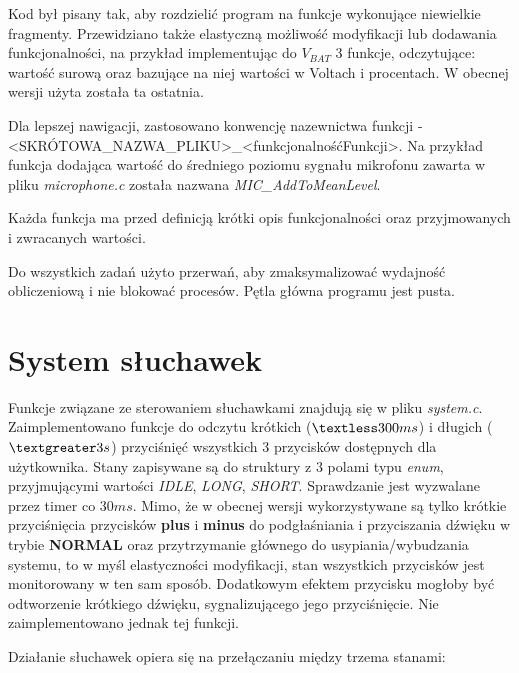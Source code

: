 Kod był pisany tak, aby rozdzielić program na funkcje wykonujące niewielkie fragmenty. Przewidziano także elastyczną możliwość modyfikacji lub dodawania funkcjonalności, na przykład implementując do $V_{BAT}$ 3 funkcje, odczytujące: wartość surową oraz bazujące na niej wartości w Voltach i procentach. W obecnej wersji użyta została ta ostatnia.

Dla lepszej nawigacji, zastosowano konwencję nazewnictwa funkcji - <SKRÓTOWA\_NAZWA\_PLIKU>\_<funkcjonalnośćFunkcji>. Na przykład funkcja dodająca wartość do średniego poziomu sygnału mikrofonu zawarta w pliku \textit{microphone.c} została nazwana \textit{MIC\_AddToMeanLevel}.

Każda funkcja ma przed definicją krótki opis funkcjonalności oraz przyjmowanych i zwracanych wartości.

Do wszystkich zadań użyto przerwań, aby zmaksymalizować wydajność obliczeniową i nie blokować procesów. Pętla główna programu jest pusta.

\section{System słuchawek}
\label{cha:soft_sys}

Funkcje związane ze sterowaniem słuchawkami znajdują się w pliku \textit{system.c}. Zaimplementowano funkcje do odczytu krótkich ($\textless 300ms$) i długich ($\textgreater 3s$) przyciśnięć wszystkich 3 przycisków dostępnych dla użytkownika. Stany zapisywane są do struktury z 3 polami typu \textit{enum}, przyjmującymi wartości \textit{IDLE}, \textit{LONG}, \textit{SHORT}. Sprawdzanie jest wyzwalane przez timer co $30ms$. Mimo, że w obecnej wersji wykorzystywane są tylko krótkie przyciśnięcia przycisków \textbf{plus} i \textbf{minus} do podgłaśniania i przyciszania dźwięku w trybie \textbf{NORMAL} oraz przytrzymanie głównego do usypiania/wybudzania systemu, to w myśl elastyczności modyfikacji, stan wszystkich przycisków jest monitorowany w ten sam sposób. Dodatkowym efektem przycisku mogłoby być odtworzenie krótkiego dźwięku, sygnalizującego jego przyciśnięcie. Nie zaimplementowano jednak tej funkcji.

Działanie słuchawek opiera się na przełączaniu między trzema stanami:

